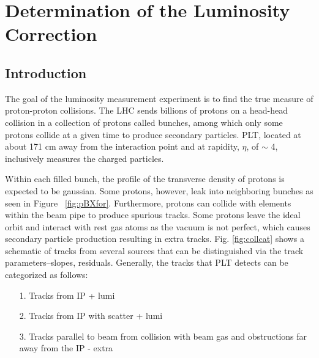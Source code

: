 \chapter{Determination of the Luminosity Correction} \label{ch:Correction}

\section{Introduction} \label{sec:corrIntro}
The goal of the luminosity measurement experiment is to find the true measure of proton-proton collisions. The LHC sends billions of protons on a head-head collision in a collection of protons called bunches, among which only some protons collide at a given time to produce secondary particles. PLT, located at about 171 cm away from the interaction point and at rapidity, $\eta$,  of $\sim$ 4, inclusively measures the charged particles. 

Within each filled bunch, the profile of the transverse density of protons is expected to be gaussian. Some protons, however, leak into neighboring bunches as seen in Figure ~\ref{fig:pBXfor}. Furthermore, protons can collide with elements within the beam pipe to produce spurious tracks. Some protons leave the ideal orbit and interact with rest gas atoms as the vacuum is not perfect, which causes secondary particle production resulting in extra tracks. 
Fig. \ref{fig:collcat} shows a schematic of tracks from several sources that can be distinguished via the track parameters--slopes, residuals. Generally, the tracks that PLT detects can be categorized as follows:


\begin{itemize}
    \item [1.] Tracks from IP   {\hfill + lumi}
    \item [2.] Tracks from IP with scatter  {\hfill + lumi}
    \item [3.] Tracks parallel to beam from collision with beam gas and obstructions far away from the IP    {\hfill - extra}
\end{itemize}




